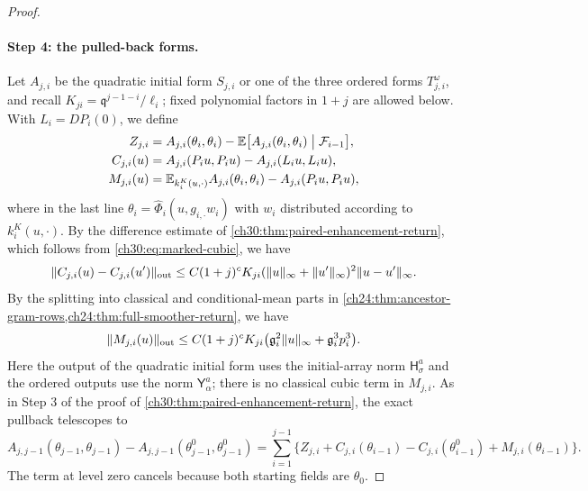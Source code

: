 \begin{proof}
\paragraph{Step 4: the pulled-back forms.} Let $A_{j,i}$ be the quadratic initial form $S_{j,i}$ or one of the three ordered forms $T^\omega_{j,i}$, and recall $K_{ji}=\mathfrak q^{j-1-i}/\ell_i$; fixed polynomial factors in $1+j$ are allowed below. With $L_i=DP_i(0)$, we define
\[
 \begin{split}
 Z_{j,i}&=A_{j,i}(\theta_i,\theta_i)-\mathbb E\bigl[A_{j,i}(\theta_i,\theta_i)\bigm|\mathcal F_{i-1}\bigr],\\
 C_{j,i}(u)&=A_{j,i}(P_iu,P_iu)-A_{j,i}(L_iu,L_iu),\\
 M_{j,i}(u)&=\mathbb E_{k_i^K(u,\cdot)}A_{j,i}(\theta_i,\theta_i)-A_{j,i}(P_iu,P_iu),
 \end{split}
\]
where in the last line $\theta_i=\widehat\Phi_i(u,g_{i,\cdot}w_i)$ with $w_i$ distributed according to $k_i^K(u,\cdot)$. By the difference estimate of \cref{ch30:thm:paired-enhancement-return}, which follows from \eqref{ch30:eq:marked-cubic}, we have
\[
 \lVert C_{j,i}(u)-C_{j,i}(u')\rVert_{\mathrm{out}}\le C(1+j)^cK_{ji}(\lVert u\rVert_\infty+\lVert u'\rVert_\infty)^2\lVert u-u'\rVert_\infty .
\]
By the splitting into classical and conditional-mean parts in \cref{ch24:thm:ancestor-gram-rows,ch24:thm:full-smoother-return}, we have
\begin{equation}\label{ch30:eq:terminal-quantum}
 \lVert M_{j,i}(u)\rVert_{\mathrm{out}}\le C(1+j)^cK_{ji}\bigl(\mathfrak g_i^2\lVert u\rVert_\infty+\mathfrak g_i^3p_i^3\bigr).
\end{equation}
Here the output of the quadratic initial form uses the initial-array norm $\mathsf H_\sigma^a$ and the ordered outputs use the norm $\mathsf Y_\alpha^a$; there is no classical cubic term in $M_{j,i}$. As in Step 3 of the proof of \cref{ch30:thm:paired-enhancement-return}, the exact pullback telescopes to
\begin{equation}\label{ch30:eq:terminal-ancestor}
 A_{j,j-1}(\theta_{j-1},\theta_{j-1})-A_{j,j-1}(\theta_{j-1}^0,\theta_{j-1}^0)=\sum_{i=1}^{j-1}\bigl\{Z_{j,i}+C_{j,i}(\theta_{i-1})-C_{j,i}(\theta_{i-1}^0)+M_{j,i}(\theta_{i-1})\bigr\}.
\end{equation}
The term at level zero cancels because both starting fields are $\theta_0$.


\end{proof}
